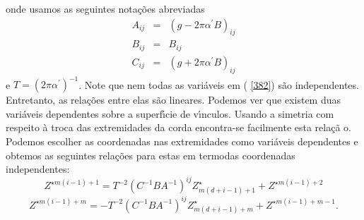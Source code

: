 \documentclass[a4paper,thmsa,12pt]{report}
\begin{document}
onde usamos as seguintes nota\c{c}\~{o}es abreviadas 
\begin{eqnarray}
A_{ij} &=&(g-2\pi \alpha ^{\prime }B)_{ij}  \nonumber \\
B_{ij} &=&B_{ij}  \nonumber \\
C_{ij} &=&(g+2\pi \alpha ^{\prime }B)_{ij}  \label{383}
\end{eqnarray}
e $T=(2\pi \alpha ^{\prime })^{-1}$. Note que nem todas as vari\'{a}veis em (%
\ref{382}) s\~{a}o independentes. Entretanto, as rela\c{c}\~{o}es entre elas
s\~{a}o lineares. Podemos ver que existem duas vari\'{a}veis dependentes
sobre a superf\'{\i}cie de v\'{\i}nculos. Usando a simetria com respeito \`{a}
troca das extremidades da corda encontra-se facilmente esta rela\c{c}\~{a}%
o. Podemos escolher as coordenadas nas extremidades como vari\'{a}veis
dependentes e obtemos as seguintes rela\c{c}\~{o}es para estas em termodas
coordenadas independentes: 
\begin{equation}
Z^{\star m\left( i-1\right) +1}=T^{-2}\left( C^{-1}BA^{-1}\right)
^{ij}Z_{m\left( d+i-1\right) +1}^{\star }+Z^{\star m\left( i-1\right) +2}
\label{384}
\end{equation}
\begin{equation}
Z^{\star m\left( i-1\right) +m}=-T^{-2}\left( C^{-1}BA^{-1}\right)
^{ij}Z_{m\left( d+i-1\right) +m}^{\star }+Z^{\star m\left( i-1\right) +m-1}.
\label{385}
\end{equation}
\end{document}
